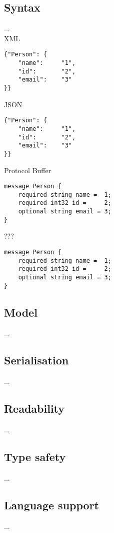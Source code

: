 \documentclass[../report.tex]{subfiles}
\begin{document}
\subsection{Syntax}

... \\

XML
\begin{verbatim}
{"Person": {
    "name":     "1",
    "id":       "2",
    "email":    "3"
}}
\end{verbatim}

JSON
\begin{verbatim}
{"Person": {
    "name":     "1",
    "id":       "2",
    "email":    "3"
}}
\end{verbatim}

Protocol Buffer
\begin{verbatim}
message Person {
    required string name =  1;
    required int32 id =     2;
    optional string email = 3;
}
\end{verbatim}

???
\begin{verbatim}
message Person {
    required string name =  1;
    required int32 id =     2;
    optional string email = 3;
}
\end{verbatim}

\subsection{Model}

...

\subsection{Serialisation}

...

\subsection{Readability}

...

\subsection{Type safety}

...

\subsection{Language support}

...
\end{document}
